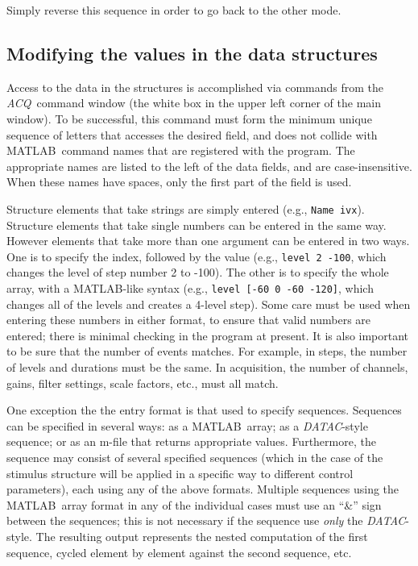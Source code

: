\documentclass[11pt, letterpaper, titlepage]{paper}
\newcommand{\acq}{\textsl{ACQ}}
\newcommand{\datac}{\textsl{DATAC}}
\newcommand{\ml}{\textsf{MATLAB}}
\begin{document}
Simply reverse this sequence in order to go back to the other 
mode. 


\subsection{Modifying the values in the data structures}
Access to the data in the structures is accomplished via commands 
from the \acq\ command window (the white box in the upper left 
corner of the main window). To be successful, this command must 
form the minimum unique sequence of letters that accesses the 
desired field, and does not collide with \ml\ command names that 
are registered with the program. The appropriate names are listed 
to the left of the data fields, and are case-insensitive. When 
these names have spaces, only the first part of the field is used.

Structure elements that take strings are simply entered (e.g., 
\texttt{Name ivx}). Structure elements that take single numbers 
can be entered in the same way. However elements that take more 
than one argument can be entered in two ways. One is to specify 
the index, followed by the value (e.g., \texttt{level 2 -100}, 
which changes the level of step number 2 to -100). The other is to 
specify the whole array, with a \ml-like syntax (e.g., 
\texttt{level [-60 0 -60 -120]}, which changes all of the levels 
and creates a 4-level step). Some care must be used when entering 
these numbers in either format, to ensure that valid numbers are 
entered; there is minimal checking in the program at present. It 
is also important to be sure that the number of events matches. 
For example, in steps, the number of levels and durations must be 
the same. In acquisition, the number of channels, gains, filter 
settings, scale factors, etc., must all match.

One exception the the entry format is that used to specify 
sequences. Sequences can be specified in several ways: as a \ml\ 
array; as a \datac-style sequence; or as an m-file that returns 
appropriate values. Furthermore, the sequence may consist of 
several specified sequences (which in the case of the stimulus 
structure will be applied in a specific way to different control 
parameters), each using any of the above formats. Multiple 
sequences using the \ml\ array format in any of the individual 
cases must use an ``\&'' sign between the sequences; this is not 
necessary if the sequence use \textit{only} the \datac-style. The 
resulting output represents the nested computation of the first 
sequence, cycled element by element against the second sequence, 
etc.
\end{document}
